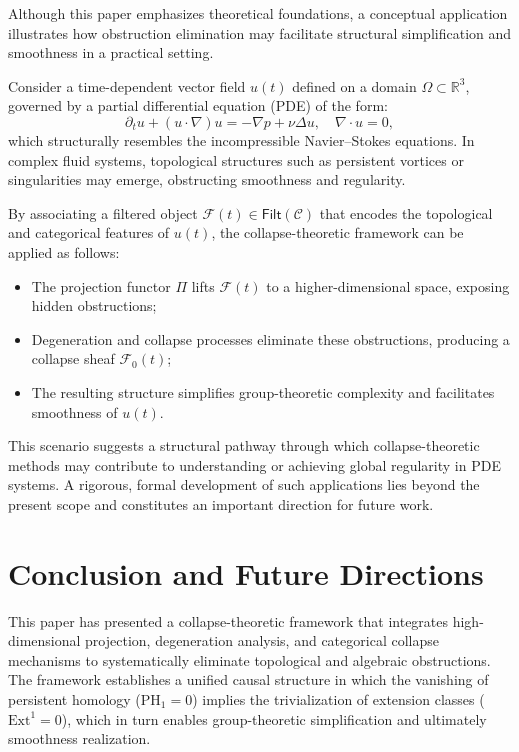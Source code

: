 \documentclass[11pt]{article}
\begin{document}
Although this paper emphasizes theoretical foundations, a conceptual application illustrates how obstruction elimination may facilitate structural simplification and smoothness in a practical setting.

Consider a time-dependent vector field $u(t)$ defined on a domain $\Omega \subset \mathbb{R}^3$, governed by a partial differential equation (PDE) of the form:
\[
\partial_t u + (u \cdot \nabla)u = -\nabla p + \nu \Delta u, \quad \nabla \cdot u = 0,
\]
which structurally resembles the incompressible Navier–Stokes equations. In complex fluid systems, topological structures such as persistent vortices or singularities may emerge, obstructing smoothness and regularity.

By associating a filtered object $\mathcal{F}(t) \in \mathsf{Filt}(\mathcal{C})$ that encodes the topological and categorical features of $u(t)$, the collapse-theoretic framework can be applied as follows:

\begin{itemize}
    \item The projection functor $\Pi$ lifts $\mathcal{F}(t)$ to a higher-dimensional space, exposing hidden obstructions;
    \item Degeneration and collapse processes eliminate these obstructions, producing a collapse sheaf $\mathcal{F}_0(t)$;
    \item The resulting structure simplifies group-theoretic complexity and facilitates smoothness of $u(t)$.
\end{itemize}

This scenario suggests a structural pathway through which collapse-theoretic methods may contribute to understanding or achieving global regularity in PDE systems. A rigorous, formal development of such applications lies beyond the present scope and constitutes an important direction for future work.



\section{Conclusion and Future Directions}

This paper has presented a collapse-theoretic framework that integrates high-dimensional projection, degeneration analysis, and categorical collapse mechanisms to systematically eliminate topological and algebraic obstructions. The framework establishes a unified causal structure in which the vanishing of persistent homology ($\mathrm{PH}_1 = 0$) implies the trivialization of extension classes ($\mathrm{Ext}^1 = 0$), which in turn enables group-theoretic simplification and ultimately smoothness realization.
\end{document}
